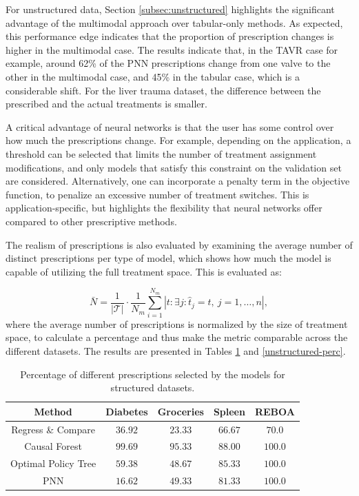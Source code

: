 \documentclass[10pt]{article} %
\begin{document}
For unstructured data, Section \ref{subsec:unstructured} highlights the significant advantage of the multimodal approach over tabular-only methods. As expected, this performance edge indicates that the proportion of prescription changes is higher in the multimodal case. The results indicate that, in the TAVR case for example, around 62\% of the PNN prescriptions change from one valve to the other in the multimodal case, and 45\% in the tabular case, which is a considerable shift. For the liver trauma dataset, the difference between the prescribed and the actual treatments is smaller. 

A critical advantage of neural networks is that the user has some control over how much the prescriptions change. For example, depending on the application, a threshold can be selected that limits the number of treatment assignment modifications, and only models that satisfy this constraint on the validation set are considered. Alternatively, one can incorporate a penalty term in the objective function, to penalize an excessive number of treatment switches. This is application-specific, but highlights the flexibility that neural networks offer compared to other prescriptive methods.

The realism of prescriptions is also evaluated by examining the average number of distinct prescriptions per type of model, which shows how much the model is capable of utilizing the full treatment space. This is evaluated as:

\begin{equation}
    \bar{N} = \frac{1}{|\mathcal{T}|} \cdot \frac{1}{N_m} \sum_{i=1}^{N_m}| t: \exists j: \hat{t}_j = t, \ j=1,\dots, n|,
\end{equation}
where the average number of prescriptions is normalized by the size of treatment space, to calculate a percentage and thus make the metric comparable across the different datasets. The results are presented in Tables \ref{structured-perc} and \ref{unstructured-perc}. 


\begin{table}[ht]\setlength\extrarowheight{1.35pt}\caption{Percentage of different prescriptions selected by the models for structured datasets.}\label{structured-perc}
\begin{center}
\begin{tabular}{ccccc}
\textbf{Method}
& \textbf{Diabetes} & \textbf{Groceries} & \textbf{Spleen} & \textbf{REBOA} \\ \midrule
Regress \& Compare & $36.92$ &  $23.33$ & $66.67$ & $70.0$ \\ 
Causal Forest & $99.69$& $95.33$ & $ 88.00$ & $100.0$\\ 
Optimal Policy Tree & $59.38$ &  $48.67$ & $85.33$ & $100.0$\\ 
PNN & $16.62$ & $49.33$ & $81.33$& $100.0$\\ 
\end{tabular}
\end{center}
\end{table}
\end{document}
